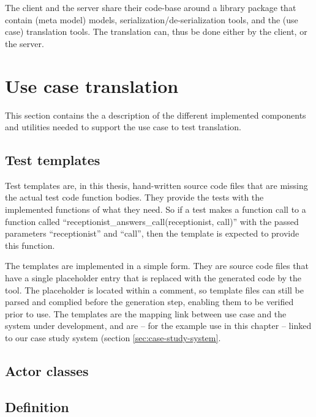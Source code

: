 \noindent The client and the server share their code-base around a library package that contain (meta model) models, serialization/de-serialization tools, and the (use case) translation tools. The translation can, thus be done either by the client, or the server.

\section{Use case translation}
This section contains the a description of the different implemented components and utilities needed to support the use case to test translation.

\subsection{Test templates}
Test templates are, in this thesis, hand-written source code files that are missing the actual test code function bodies. They provide the tests with the implemented functions of what they need. So if a test makes a function call to a function called ``receptionist\_answers\_call(receptionist, call)'' with the passed parameters ``receptionist'' and ``call'', then the template is expected to provide this function.\medskip

\noindent The templates are implemented in a simple form. They are source code files that have a single placeholder entry that is replaced with the generated code by the tool. The placeholder is located within a comment, so template files can still be parsed and complied before the generation step, enabling them to be verified prior to use.\medskip
The templates are the mapping link between use case and the system under development, and are -- for the example use in this chapter -- linked to our case study system (section \ref{sec:case-study-system}.

\subsection{Actor classes}

\subsection{Definition}

